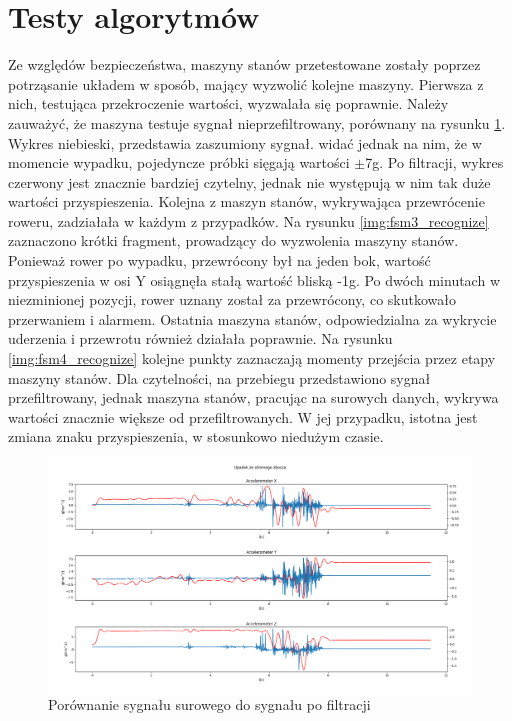 \section{Testy algorytmów}
Ze względów bezpieczeństwa, maszyny stanów przetestowane zostały poprzez potrząsanie układem w sposób, mający wyzwolić kolejne maszyny. Pierwsza z nich, testująca przekroczenie wartości, wyzwalała się poprawnie. Należy zauważyć, że maszyna testuje sygnał nieprzefiltrowany, porównany na rysunku \ref{img:signal_comparsion}. Wykres niebieski, przedstawia zaszumiony sygnał. widać jednak na nim, że w momencie wypadku, pojedyncze próbki sięgają wartości $\pm$7g. Po filtracji, wykres czerwony jest znacznie bardziej czytelny, jednak nie występują w nim tak duże wartości przyspieszenia.
\newline
Kolejna z maszyn stanów, wykrywająca przewrócenie roweru, zadziałała w każdym z przypadków. Na rysunku \ref{img:fsm3_recognize} zaznaczono krótki fragment, prowadzący do wyzwolenia maszyny stanów. Ponieważ rower po wypadku, przewrócony był na jeden bok, wartość przyspieszenia w osi Y osiągnęła stałą wartość bliską -1g. Po dwóch minutach w niezminionej pozycji, rower uznany został za przewrócony, co skutkowało przerwaniem i alarmem.
\newline
Ostatnia maszyna stanów, odpowiedzialna za wykrycie uderzenia  i przewrotu również działała poprawnie. Na rysunku \ref{img:fsm4_recognize} kolejne punkty zaznaczają momenty przejścia przez etapy maszyny stanów. Dla czytelności, na przebiegu przedstawiono sygnał przefiltrowany, jednak maszyna stanów, pracując na surowych danych, wykrywa wartości znacznie większe od przefiltrowanych. W jej przypadku, istotna jest zmiana znaku przyspieszenia, w stosunkowo niedużym czasie.


\begin{figure}[h]
    \centering
    \includegraphics[width=16cm]{Graphics/Before_and_after_filter.png}
    \caption{Porównanie sygnału surowego do sygnału po filtracji}
    \label{img:signal_comparsion}
\end{figure}

